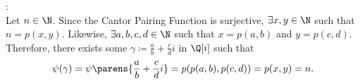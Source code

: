 \begin{problem}
\begin{answer}
\begin{enumarabic}
          \item {}: \\
            Let $n \in \N$. Since the Cantor Pairing Function is surjective,
            $\exists x, y \in \N$ such that $n = p(x, y)$.
            Likewise, $\exists a, b, c, d \in \N$ such that $x = p(a, b)$ and $y = p(c, d)$.
            Therefore, there exists some $\displaystyle \gamma \coloneq \frac{a}{b} + \frac{c}{d}i$ in $\Q[i]$
            such that
            \[ \psi(\gamma) = \psi\parens{\frac{a}{b} + \frac{c}{d}i} = p(p(a, b), p(c, d)) = p(x, y) = n. \]
        \end{enumarabic}
  \end{answer}
\end{problem}
